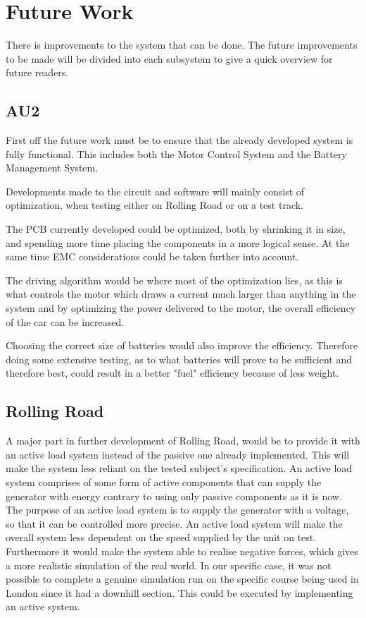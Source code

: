 \chapter {Future Work}
There is improvements to the system that can be done. The future improvements to be made will be divided into each subsystem to give a quick overview for future readers. 

\section{AU2}
First off the future work must be to ensure that the already developed system is fully functional. This includes both the Motor Control System and the Battery Management System.

Developments made to the circuit and software will mainly consist of optimization, when testing either on Rolling Road or on a test track. 

The PCB currently developed could be optimized, both by shrinking it in size, and spending more time placing the components in a more logical sense. At the same time EMC considerations could be taken further into account. 

The driving algorithm would be where most of the optimization lies, as this is what controls the motor which draws a current much larger than anything in the system and by optimizing the power delivered to the motor, the overall efficiency of the car can be increased. 

Choosing the correct size of batteries would also improve the efficiency. Therefore doing some extensive testing, as to what batteries will prove to be sufficient and therefore best, could result in a better "fuel" efficiency because of less weight.  

\section{Rolling Road}
A major part in further development of Rolling Road, would be to provide it with an active load system instead of the passive one already implemented. This will make the system less reliant on the tested subject's specification. An active load system comprises of some form of active components that can supply the generator with energy contrary to using only passive components as it is now. The purpose of an active load system is to supply the generator with a voltage, so that it can be controlled more precise. An active load system will make the overall system less dependent on the speed supplied by the unit on test. Furthermore it would make the system able to realise negative forces, which gives a more realistic simulation of the real world. In our specific case, it was not possible to complete a genuine simulation run on the specific course being used in London since it had a downhill section. This could be executed by implementing an active system. 

